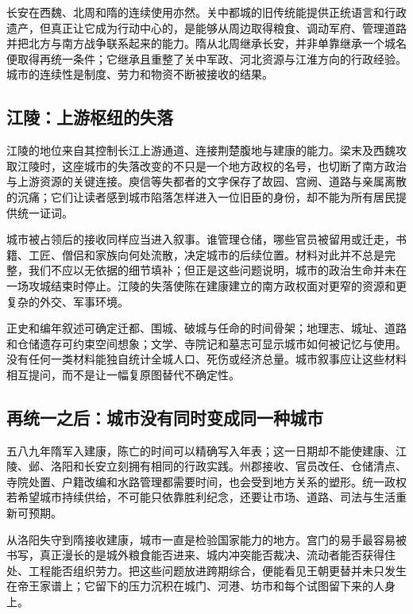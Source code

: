 长安在西魏、北周和隋的连续使用亦然。关中都城的旧传统能提供正统语言和行政遗产，但真正让它成为行动中心的，是能够从周边取得粮食、调动军府、管理道路并把北方与南方战争联系起来的能力。隋从北周继承长安，并非单靠继承一个城名便取得再统一条件；它继承且重整了关中军政、河北资源与江淮方向的行政经验。城市的连续性是制度、劳力和物资不断被接收的结果。

\subsection{江陵：上游枢纽的失落}

江陵的地位来自其控制长江上游通道、连接荆楚腹地与建康的能力。梁末及西魏攻取江陵时，这座城市的失落改变的不只是一个地方政权的名号，也切断了南方政治与上游资源的关键连接。庾信等失都者的文字保存了故园、宫阙、道路与亲属离散的沉痛；它们让读者感到城市陷落怎样进入一位旧臣的身份，却不能为所有居民提供统一证词。

城市被占领后的接收同样应当进入叙事。谁管理仓储，哪些官员被留用或迁走，书籍、工匠、僧侣和家族向何处流散，决定城市的后续位置。材料对此并不总是完整，我们不应以无依据的细节填补；但正是这些问题说明，城市的政治生命并未在一场攻城结束时停止。江陵的失落使陈在建康建立的南方政权面对更窄的资源和更复杂的外交、军事环境。

\begin{sourcenote}[城市材料的互证与边界]
正史和编年叙述可确定迁都、围城、破城与任命的时间骨架；地理志、城址、道路和仓储遗存可约束空间想象；文学、寺院记和墓志可显示城市如何被记忆与使用。没有任何一类材料能独自统计全城人口、死伤或经济总量。城市叙事应让这些材料相互提问，而不是让一幅复原图替代不确定性。
\end{sourcenote}

\subsection{再统一之后：城市没有同时变成同一种城市}

五八九年隋军入建康，陈亡的时间可以精确写入年表；这一日期却不能使建康、江陵、邺、洛阳和长安立刻拥有相同的行政实践。州郡接收、官员改任、仓储清点、寺院处置、户籍改编和水路管理都需要时间，也会受到地方关系的塑形。统一政权若希望城市持续供给，不可能只依靠胜利纪念，还要让市场、道路、司法与生活重新可预期。

从洛阳失守到隋接收建康，城市一直是检验国家能力的地方。宫门的易手最容易被书写，真正漫长的是城外粮食能否进来、城内冲突能否裁决、流动者能否获得住处、工程能否组织劳力。把这些问题放进跨期综合，便能看见王朝更替并未只发生在帝王家谱上；它留下的压力沉积在城门、河港、坊市和每个试图留下来的人身上。
